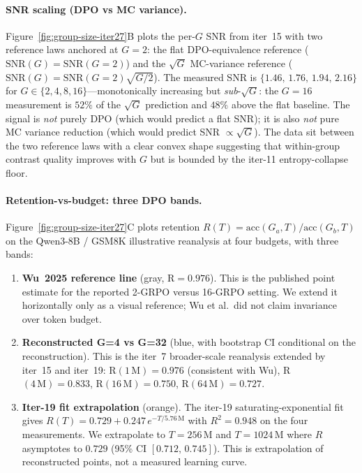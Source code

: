 \documentclass{article}
\begin{document}
\paragraph{SNR scaling (DPO vs MC variance).}
Figure~\ref{fig:group-size-iter27}B plots the per-$G$ SNR from
iter~15 with two reference laws anchored at $G{=}2$: the flat
DPO-equivalence reference ($\text{SNR}(G) = \text{SNR}(G{=}2)$) and the
$\sqrt{G}$ MC-variance reference ($\text{SNR}(G) = \text{SNR}(G{=}2)
\sqrt{G/2}$). The measured SNR is $\{1.46,\,1.76,\,1.94,\,2.16\}$
for $G\in\{2,4,8,16\}$---monotonically increasing but \emph{sub}-$\sqrt{G}$:
the $G{=}16$ measurement is $52\%$ of the $\sqrt{G}$ prediction
and $48\%$ above the flat baseline. The signal is \emph{not} purely
DPO (which would predict a flat SNR); it is also \emph{not} pure MC
variance reduction (which would predict SNR $\propto \sqrt{G}$). The
data sit between the two reference laws with a clear convex shape
suggesting that within-group contrast quality improves with $G$ but is
bounded by the iter-11 entropy-collapse floor.

\paragraph{Retention-vs-budget: three DPO bands.}
Figure~\ref{fig:group-size-iter27}C plots retention $R(T) =
\text{acc}(G_a, T) / \text{acc}(G_b, T)$ on the Qwen3-8B / GSM8K
illustrative reanalysis at four budgets, with three bands:

\begin{enumerate}
  \item \textbf{Wu~2025 reference line} (gray, R$ = 0.976$). This is
        the published point estimate for the reported 2-GRPO versus
        16-GRPO setting. We extend it horizontally only as a visual
        reference; Wu et al.\ did not claim invariance over token budget.
  \item \textbf{Reconstructed G=4 vs G=32} (blue, with bootstrap CI
        conditional on the reconstruction). This is the iter~7
        broader-scale reanalysis extended by
        iter~15 and iter~19: R$(1\,\text{M}) = 0.976$ (consistent with
        Wu), R$(4\,\text{M}) = 0.833$, R$(16\,\text{M}) = 0.750$,
        R$(64\,\text{M}) = 0.727$.
  \item \textbf{Iter-19 fit extrapolation} (orange). The iter-19
        saturating-exponential fit gives $R(T) = 0.729 + 0.247 \,
        e^{-T/5.76\,\text{M}}$ with $R^2 = 0.948$ on the four
        measurements. We extrapolate to $T{=}256\,$M and $T{=}1024\,$M
        where $R$ asymptotes to $0.729$ (95\% CI $[0.712,\,0.745]$).
        This is extrapolation of reconstructed points, not a measured
        learning curve.
\end{enumerate}
\end{document}
